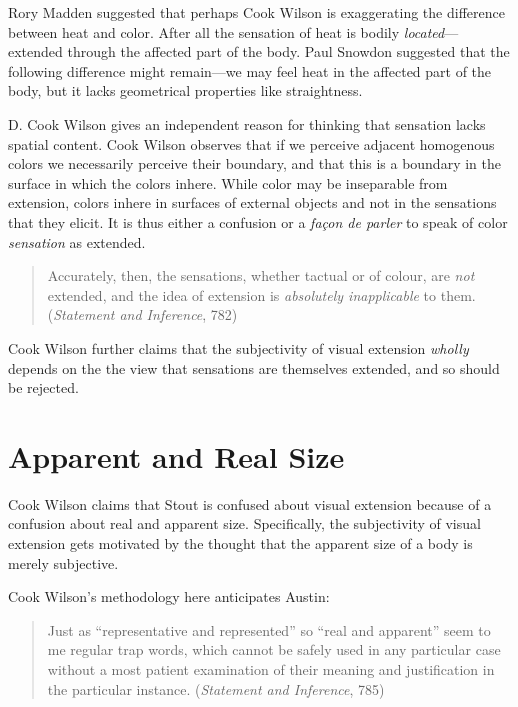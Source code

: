 \documentclass[11pt]{article}
\begin{document}
    \begin{discussion}
         Rory Madden suggested that perhaps Cook Wilson is exaggerating the difference between heat and color. After all the sensation of heat is bodily \emph{located}---extended through the affected part of the body. Paul Snowdon suggested that the following difference might remain---we may feel heat in the affected part of the body, but it lacks geometrical properties like straightness.
    \end{discussion}

D. Cook Wilson gives an independent reason for thinking that sensation lacks spatial content. Cook Wilson observes that if we perceive adjacent homogenous colors we necessarily perceive their boundary, and that this is a boundary in the surface in which the colors inhere. While color may be inseparable from extension, colors inhere in surfaces of external objects and not in the sensations that they elicit. It is thus either a confusion or a \emph{façon de parler} to speak of color \emph{sensation} as extended.
    \begin{quote}
        Accurately, then, the sensations, whether tactual or of colour, are \emph{not} extended, and the idea of extension is \emph{absolutely inapplicable} to them. (\emph{Statement and Inference}, 782)
    \end{quote}

Cook Wilson further claims that the subjectivity of visual extension \emph{wholly} depends on the the view that sensations are themselves extended, and so should be rejected.


\section{Apparent and Real Size}\label{sec:apparent_and_real_size} %

Cook Wilson claims that Stout is confused about visual extension because of a confusion about  real and apparent size. Specifically, the subjectivity of visual extension gets motivated by the thought that the apparent size of a body is merely subjective. 

Cook Wilson's methodology here anticipates Austin:
    \begin{quote}
    	Just as ``representative and represented'' so ``real and apparent'' seem to me regular trap words, which cannot be safely used in any particular case without a most patient examination of their meaning and justification in the particular instance. (\emph{Statement and Inference}, 785)
    \end{quote}
\end{document}
